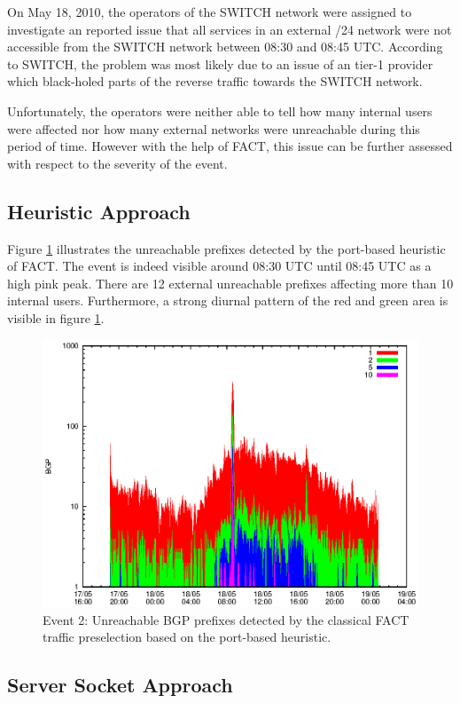 On May 18, 2010, the operators of the SWITCH network were assigned to 
investigate an reported issue that all services in an external /24 network were 
not accessible from the SWITCH network between 08:30 and 08:45 UTC. According to 
SWITCH, the problem was most likely due to an issue of an tier-1 provider which 
black-holed parts of the reverse traffic towards the SWITCH 
network\citep{SchatzmannPAM2011}.

Unfortunately, the operators were neither able to tell how many internal users 
were affected nor how many external networks were unreachable during this period 
of time. However with the help of FACT, this issue can be further assessed with 
respect to the severity of the event\citep{SchatzmannPAM2011}.

\subsection{Heuristic Approach}

Figure \ref{fig:TIER1_FACT_REF} illustrates the unreachable prefixes detected by the port-based heuristic of FACT. The event is indeed visible around 08:30 UTC until 08:45 UTC as a high pink peak. There are 12 external unreachable prefixes affecting more than 10 internal users. Furthermore, a strong diurnal pattern of the red and green area is visible in figure \ref{fig:TIER1_FACT_REF}.

\begin{figure}
	[p] \centering 
	\includegraphics[width=0.75\linewidth]{images/events/2010_05_18/bgp_log_port80_ref.eps}
	\caption{Event 2: Unreachable BGP prefixes detected by the classical FACT traffic preselection based on the port-based heuristic.} 
	\label{fig:TIER1_FACT_REF} 
\end{figure}

\subsection{Server Socket Approach}

